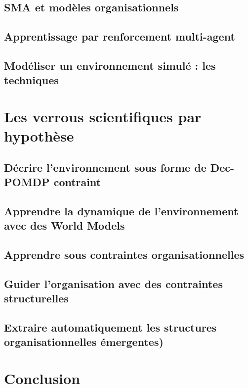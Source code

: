 \documentclass[ twoside,openright,titlepage,numbers=noenddot,headinclude,%
                footinclude=true,cleardoublepage=empty,abstractoff, %
                BCOR=5mm,paper=a4,fontsize=11pt,%
                french,american,%
                ]{scrreprt}
\begin{document}
\section{SMA et modèles organisationnels}

\section{Apprentissage par renforcement multi-agent}

\section{Modéliser un environnement simulé : les techniques }

\chapter{Les verrous scientifiques par hypothèse}

\section{Décrire l'environnement sous forme de Dec-POMDP contraint}
\section{Apprendre la dynamique de l'environnement avec des World Models}
\section{Apprendre sous contraintes organisationnelles}
\section{Guider l'organisation avec des contraintes structurelles}
\section{Extraire automatiquement les structures organisationnelles émergentes)}

\chapter*{Conclusion}
\end{document}
